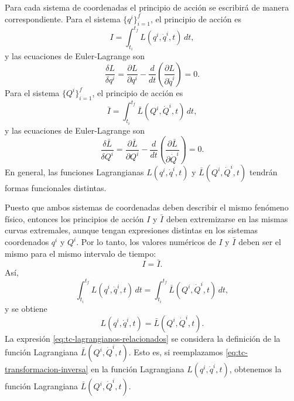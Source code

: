 \documentclass[../apunte_mecanica_clasica.tex]{subfiles}
\begin{document}
Para cada sistema de coordenadas el principio de acción se escribirá de manera correspondiente. Para el sistema \(\{q^i\}_{i=1}^{f}\), el principio de acción es
\begin{equation}
    I=\int_{t_i}^{t_f}L(q^i,\dot q^i,t)\,dt,
    \label{eq:tc-accion-q}
\end{equation}
y las ecuaciones de Euler-Lagrange son
\begin{equation}
    \frac{\delta L}{\delta q^i}
    =\frac{\partial L}{\partial q^i}
    -\frac{d}{dt}\left(\frac{\partial L}{\partial \dot q^i}\right)=0.
    \label{eq:tc-euler-lagrange-q}
\end{equation}
Para el sistema \(\{Q^i\}_{i=1}^{f}\), el principio de acción es
\begin{equation}
    \bar I=\int_{t_i}^{t_f}\bar L(Q^i,\dot Q^i,t)\,dt,
    \label{eq:tc-accion-Q}
\end{equation}
y las ecuaciones de Euler-Lagrange son
\begin{equation}
    \frac{\delta \bar L}{\delta Q^i}
    =\frac{\partial \bar L}{\partial Q^i}
    -\frac{d}{dt}\left(\frac{\partial \bar L}{\partial \dot Q^i}\right)=0.
    \label{eq:tc-euler-lagrange-Q}
\end{equation}
En general, las funciones Lagrangianas \(L(q^i,\dot q^i,t)\) y \(\bar L(Q^i,\dot Q^i,t)\) tendrán formas funcionales distintas.

Puesto que ambos sistemas de coordenadas deben describir el mismo fenómeno físico, entonces los principios de acción \(I\) y \(\bar I\) deben extremizarse en las mismas curvas extremales, aunque tengan expresiones distintas en los sistemas coordenados \(q^i\) y \(Q^i\). Por lo tanto, los valores numéricos de \(I\) y \(\bar I\) deben ser el mismo para el mismo intervalo de tiempo:
\begin{equation}
    I=\bar I.
    \label{eq:tc-igualdad-acciones}
\end{equation}
Así,
\begin{equation}
    \int_{t_i}^{t_f}L(q^i,\dot q^i,t)\,dt
    =
    \int_{t_i}^{t_f}\bar L(Q^i,\dot Q^i,t)\,dt,
    \label{eq:tc-igualdad-integrales-accion}
\end{equation}
y se obtiene
\begin{equation}
    L(q^i,\dot q^i,t)=\bar L(Q^i,\dot Q^i,t).
    \label{eq:tc-lagrangianos-relacionados}
\end{equation}
La expresión \eqref{eq:tc-lagrangianos-relacionados} se considera la definición de la función Lagrangiana \(\bar L(Q^i,\dot Q^i,t)\). Esto es, si reemplazamos \eqref{eq:tc-transformacion-inversa} en la función Lagrangiana \(L(q^i,\dot q^i,t)\), obtenemos la función Lagrangiana \(\bar L(Q^i,\dot Q^i,t)\).
\end{document}
